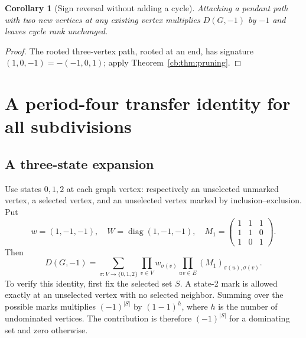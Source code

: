 \documentclass[11pt]{article}
\numberwithin{equation}{section}
\newtheorem{corollary}[theorem]{Corollary}
\theoremstyle{definition}
\newcommand{\diag}{\operatorname{diag}}
\begin{document}
\begin{corollary}[Sign reversal without adding a cycle]\label{cb:cor:sign}
Attaching a pendant path with two new vertices at any existing vertex
multiplies $D(G,-1)$ by $-1$ and leaves cycle rank unchanged.
\end{corollary}
\begin{proof}
The rooted three-vertex path, rooted at an end, has signature
$(1,0,-1)=-(-1,0,1)$; apply Theorem~\ref{cb:thm:pruning}.
\end{proof}

\section{A period-four transfer identity for all subdivisions}

\subsection{A three-state expansion}
Use states $0,1,2$ at each graph vertex: respectively an unselected
unmarked vertex, a selected vertex, and an unselected vertex marked by
inclusion--exclusion. Put
\begin{equation}\label{cb:eq:matrixbase}
 w=(1,-1,-1),\quad W=\diag(1,-1,-1),\quad
 M_1=\begin{pmatrix}1&1&1\\1&1&0\\1&0&1\end{pmatrix}.
\end{equation}
Then
\begin{equation}\label{cb:eq:spin}
 D(G,-1)=\sum_{\sigma:V\to\{0,1,2\}}
 \prod_{v\in V}w_{\sigma(v)}
 \prod_{uv\in E}(M_1)_{\sigma(u),\sigma(v)}.
\end{equation}
To verify this identity, first fix the selected set $S$. A state-2 mark is
allowed exactly at an unselected vertex with no selected neighbor.
Summing over the possible marks multiplies $(-1)^{|S|}$ by $(1-1)^h$,
where $h$ is the number of undominated vertices. The contribution is
therefore $(-1)^{|S|}$ for a dominating set and zero otherwise.
\end{document}
